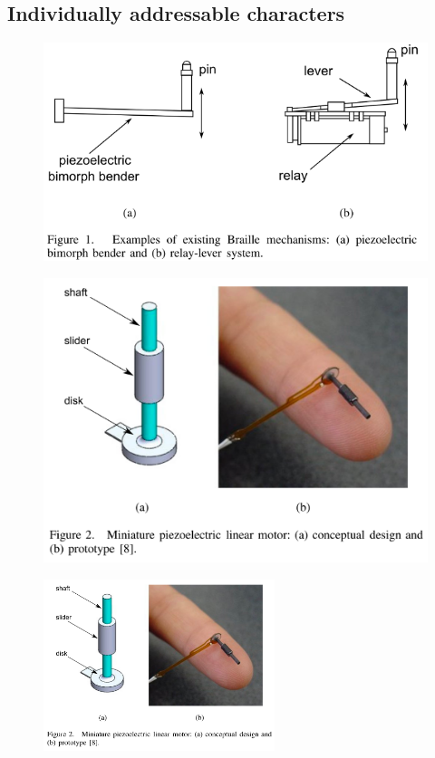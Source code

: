     \subsection{Individually addressable characters}
\begin{figure} \centering
    \includegraphics[width=\textwidth]{figures/piezo-bender.png}
\caption{}
\label{fig:piezo-bender}
\end{figure}

\begin{figure} \centering
    \includegraphics[width=\textwidth]{figures/piezo-miniature.png}
\caption{}
\label{fig:piezo-miniature}
\end{figure}
\begin{figure} \centering
    \includegraphics[height=5cm]{figures/piezo-miniature.png}
\caption{}
\label{fig:piezo-miniature}
\end{figure}

